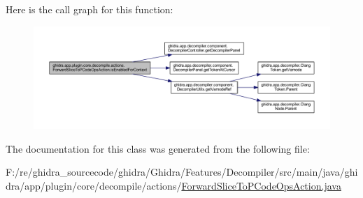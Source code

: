 Here is the call graph for this function\+:
\nopagebreak
\begin{figure}[H]
\begin{center}
\leavevmode
\includegraphics[width=350pt]{classghidra_1_1app_1_1plugin_1_1core_1_1decompile_1_1actions_1_1_forward_slice_to_p_code_ops_action_a5613df436b98ac3fd0451ffa778fe692_cgraph}
\end{center}
\end{figure}


The documentation for this class was generated from the following file\+:\begin{DoxyCompactItemize}
\item 
F\+:/re/ghidra\+\_\+sourcecode/ghidra/\+Ghidra/\+Features/\+Decompiler/src/main/java/ghidra/app/plugin/core/decompile/actions/\mbox{\hyperlink{_forward_slice_to_p_code_ops_action_8java}{Forward\+Slice\+To\+P\+Code\+Ops\+Action.\+java}}\end{DoxyCompactItemize}
